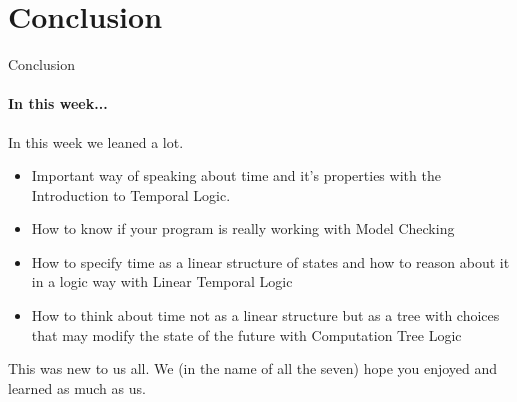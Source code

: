 \section{Conclusion}

\begin{frame}{Conclusion}
    \framesubtitle{In this week...}
    In this week we leaned a lot. 
    
    \begin{itemize}
        \item Important way of speaking about time and it's properties  with the Introduction to Temporal Logic. \pause
        
        \item How to know if your program is really working with Model Checking \pause
        
        \item How to specify time as a linear structure of states and how to reason about it in a logic way with Linear Temporal Logic \pause
        
        \item How to think about time not as a linear structure but as a tree with choices that may modify the state of the future with Computation Tree Logic \pause
    \end{itemize}
    
     This was new to us all. We (in the name of all the seven) hope you enjoyed and learned as much as us.
\end{frame}

